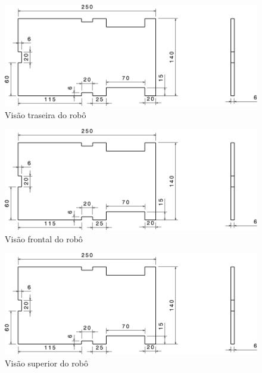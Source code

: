 \begin{figure}[htb]
  \caption{\label{fig:structure-back} Visão traseira do robô}

  \begin{center}
    \includegraphics[scale=0.525,page=3]{../img/structure.pdf}
  \end{center}

\end{figure}

\begin{figure}[htb]
  \caption{\label{fig:structure-front} Visão frontal do robô}

  \begin{center}
    \includegraphics[scale=0.525,page=4]{../img/structure.pdf}
  \end{center}

\end{figure}

\begin{figure}[htb]
  \caption{\label{fig:structure-up} Visão superior do robô}

  \begin{center}
    \includegraphics[scale=0.525,page=5]{../img/structure.pdf}
  \end{center}

\end{figure}


